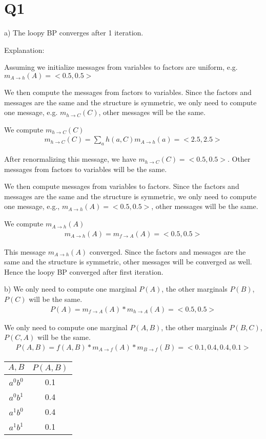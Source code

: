 
\section*{Q1}
\newpage
a) The loopy BP converges after 1 iteration.

Explanation:

Assuming we initialize messages from variables to factors are uniform, e.g. $m_{A \to h}(A)=<0.5,0.5>$

We then compute the messages from factors to variables. Since the factors and messages are the same and the structure is symmetric, we only need to compute one message, e.g. $m_{h \to C}(C)$, other messages will be the same.

We compute $m_{h \to C}(C)$
\begin{align*}
  m_{h \to C}(C) = \sum_{a}h(a,C)m_{A \to h}(a) = <2.5,2.5>
\end{align*}

After renormalizing this message, we have $m_{h \to C}(C) = <0.5,0.5>$. Other messages from factors to variables will be the same.

We then compute messages from variables to factors. Since the factors and messages are the same and the structure is symmetric, we only need to compute one message, e.g., $m_{A \to h}(A)=<0.5,0.5>$, other messages will be the same.

We compute $m_{A \to h}(A)$
\begin{align*}
  m_{A \to h}(A) = m_{f \to A}(A) = <0.5,0.5>
\end{align*}

This message $m_{A \to h}(A)$ converged. Since the factors and messages are the same and the structure is symmetric, other messages will be converged as well. Hence the loopy BP converged after first iteration.

\pagebreak
b) We only need to compute one marginal $P(A)$, the other marginals $P(B)$, $P(C)$ will be the same.
\begin{align*}
  P(A) = m_{f \to A}(A)*m_{h \to A}(A) = <0.5, 0.5>
\end{align*}

We only need to compute one marginal $P(A,B)$, the other marginals $P(B,C)$, $P(C,A)$ will be the same.
\begin{align*}
  P(A,B) = f(A,B)*m_{A \to f}(A)*m_{B \to f}(B) = <0.1,0.4,0.4,0.1>
\end{align*}

\begin{tabular}{|c|c|}
  \hline
  $A,B$  & $P(A,B)$ \\
  \hline
  $a^0 b^0$ & 0.1 \\
  $a^0 b^1$ & 0.4 \\
  $a^1 b^0$ & 0.4 \\
  $a^1 b^1$ & 0.1 \\
  \hline
\end{tabular}

